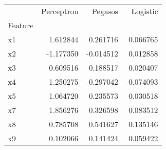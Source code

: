 \begin{tabular}{lrrr}
\toprule
 & Perceptron & Pegasos & Logistic \\
Feature &  &  &  \\
\midrule
x1 & 1.612844 & 0.261716 & 0.066765 \\
x2 & -1.177350 & -0.014512 & 0.012858 \\
x3 & 0.609516 & 0.188517 & 0.020407 \\
x4 & 1.250275 & -0.297042 & -0.074093 \\
x5 & 1.064720 & 0.235573 & 0.030518 \\
x7 & 1.856276 & 0.326598 & 0.083512 \\
x8 & 0.785708 & 0.541627 & 0.135146 \\
x9 & 0.102066 & 0.141424 & 0.059422 \\
\bottomrule
\end{tabular}
